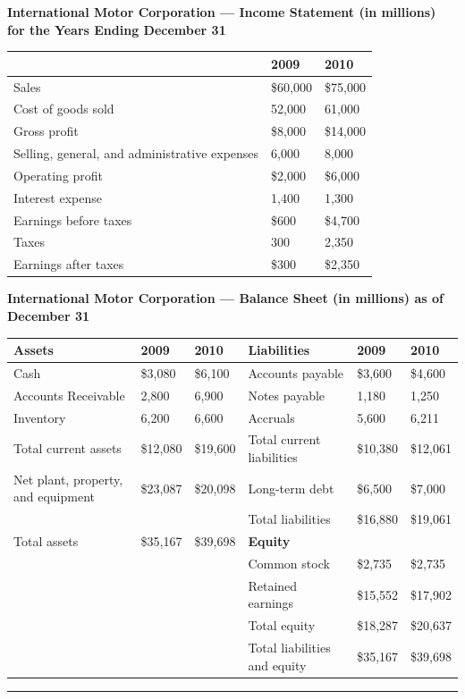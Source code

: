 \documentclass[11pt,a4paper]{article}
\newcommand{\stmtend}{\par\endgroup\nopagebreak\noindent\rule{\linewidth}{0.4pt}\par\medskip}
\begin{document}
\textbf{International Motor Corporation --- Income Statement (in millions) for the Years Ending
December 31}

{\def\LTcaptype{none} %
\begin{longtable}[]{@{}lll@{}}
\toprule\noalign{}
& 2009 & 2010 \\
\midrule\noalign{}
\endhead
\bottomrule\noalign{}
\endlastfoot
Sales & \$60,000 & \$75,000 \\
Cost of goods sold & 52,000 & 61,000 \\
Gross profit & \$8,000 & \$14,000 \\
Selling, general, and administrative expenses & 6,000 & 8,000 \\
Operating profit & \$2,000 & \$6,000 \\
Interest expense & 1,400 & 1,300 \\
Earnings before taxes & \$600 & \$4,700 \\
Taxes & 300 & 2,350 \\
Earnings after taxes & \$300 & \$2,350 \\
\end{longtable}
}

\textbf{International Motor Corporation --- Balance Sheet (in millions) as of December 31}

{\def\LTcaptype{none} %
\begin{longtable}[]{@{}llllll@{}}
\toprule\noalign{}
Assets & 2009 & 2010 & Liabilities & 2009 & 2010 \\
\midrule\noalign{}
\endhead
\bottomrule\noalign{}
\endlastfoot
Cash & \$3,080 & \$6,100 & Accounts payable & \$3,600 & \$4,600 \\
Accounts Receivable & 2,800 & 6,900 & Notes payable & 1,180 & 1,250 \\
Inventory & 6,200 & 6,600 & Accruals & 5,600 & 6,211 \\
Total current assets & \$12,080 & \$19,600 & Total current liabilities & \$10,380 & \$12,061 \\
Net plant, property, and equipment & \$23,087 & \$20,098 & Long-term debt & \$6,500 & \$7,000 \\
& & & Total liabilities & \$16,880 & \$19,061 \\
Total assets & \$35,167 & \$39,698 & \textbf{Equity} & & \\
& & & Common stock & \$2,735 & \$2,735 \\
& & & Retained earnings & \$15,552 & \$17,902 \\
& & & Total equity & \$18,287 & \$20,637 \\
& & & Total liabilities and equity & \$35,167 & \$39,698 \\
\end{longtable}
}
\stmtend
\end{document}
